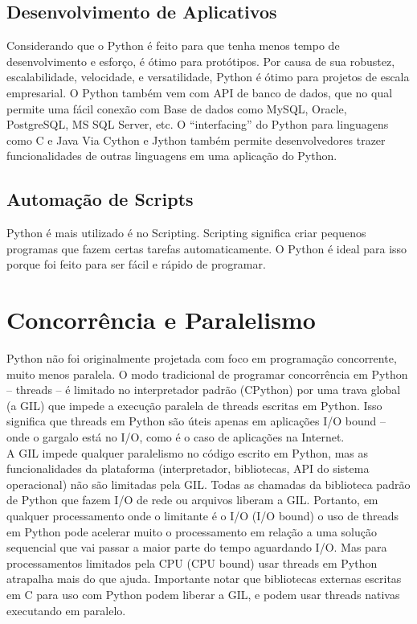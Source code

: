 \documentclass[12pt]{article}
\begin{document}
\subsection{Desenvolvimento de Aplicativos}

Considerando que o Python é feito para que tenha menos tempo de desenvolvimento e esforço,  é ótimo para protótipos. Por causa de sua robustez, escalabilidade, velocidade, e versatilidade, Python é ótimo para projetos de escala empresarial. O Python também vem com API de banco de dados, que no qual permite uma fácil conexão com Base de dados como MySQL, Oracle, PostgreSQL, MS SQL Server, etc. O “interfacing” do Python para linguagens como C e Java Via Cython e Jython também permite desenvolvedores trazer funcionalidades de outras linguagens em uma aplicação do Python.

\subsection{Automação de Scripts}

Python é mais utilizado é no Scripting. Scripting significa criar pequenos programas que fazem certas tarefas automaticamente. O Python é ideal para isso porque foi feito para ser fácil e rápido de programar.





\section{Concorrência e Paralelismo}

Python não foi originalmente projetada com foco em programação concorrente, muito menos paralela. O modo tradicional de programar concorrência em Python -- threads -- é limitado no interpretador padrão (CPython) por uma trava global (a GIL) que impede a execução paralela de threads escritas em Python. Isso significa que threads em Python são úteis apenas em aplicações I/O bound -- onde o gargalo está no I/O, como é o caso de aplicações na Internet.\\
A GIL impede qualquer paralelismo no código escrito em Python, mas as funcionalidades da plataforma (interpretador, bibliotecas, API do sistema operacional) não são limitadas pela GIL. Todas as chamadas da biblioteca padrão de Python que fazem I/O de rede ou arquivos liberam a GIL. Portanto, em qualquer processamento onde o limitante é o I/O (I/O bound) o uso de threads em Python pode acelerar muito o processamento em relação a uma solução sequencial que vai passar a maior parte do tempo aguardando I/O. Mas para processamentos limitados pela CPU (CPU bound) usar threads em Python atrapalha mais do que ajuda. Importante notar que bibliotecas externas escritas em C para uso com Python podem liberar a GIL, e podem usar threads nativas executando em paralelo.
\end{document}
